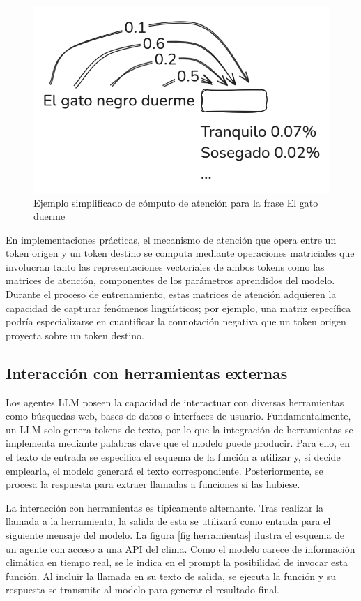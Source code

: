 \begin{figure}
    \centering
    \includegraphics[width=0.65\linewidth]{figures/atencion_poc.png}
    \caption{Ejemplo simplificado de cómputo de atención para la frase \textquotedbl El gato duerme\textquotedbl}
    \label{fig:atencion_gato}
\end{figure}

En implementaciones prácticas, el mecanismo de atención que opera entre un token origen y un token destino se computa mediante operaciones matriciales que involucran tanto las representaciones vectoriales de ambos tokens como las matrices de atención, componentes de los parámetros aprendidos del modelo. Durante el proceso de entrenamiento, estas matrices de atención adquieren la capacidad de capturar fenómenos lingüísticos; por ejemplo, una matriz específica podría especializarse en cuantificar la connotación negativa que un token origen proyecta sobre un token destino.

\subsection{Interacción con herramientas externas}
Los agentes LLM poseen la capacidad de interactuar con diversas herramientas como búsquedas web, bases de datos o interfaces de usuario. Fundamentalmente, un LLM solo genera tokens de texto, por lo que la integración de herramientas se implementa mediante palabras clave que el modelo puede producir. Para ello, en el texto de entrada se especifica el esquema de la función a utilizar y, si decide emplearla, el modelo generará el texto correspondiente. Posteriormente, se procesa la respuesta para extraer llamadas a funciones si las hubiese.

La interacción con herramientas es típicamente alternante. Tras realizar la llamada a la herramienta, la salida de esta se utilizará como entrada para el siguiente mensaje del modelo. La figura \ref{fig:herramientas} ilustra el esquema de un agente con acceso a una API del clima. Como el modelo carece de información climática en tiempo real, se le indica en el prompt la posibilidad de invocar esta función. Al incluir la llamada en su texto de salida, se ejecuta la función y su respuesta se transmite al modelo para generar el resultado final.

